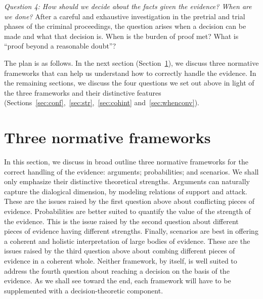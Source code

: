 \documentclass[10pt]{article}
\begin{document}

\textit{Question 4:	How should we decide about the facts given the evidence? When are we done?}
After a careful and exhaustive investigation in the pretrial and trial phases of the criminal proceedings, the question arises when a decision can be made and what that decision is. When is the burden of proof met? 
What is ``proof beyond a reasonable doubt''? %

\vspace{1em}
\noindent
The plan is as follows. In the next section (Section~\ref{sec:frameworks}), we discuss three normative frameworks 
that can help us understand how to correctly handle the evidence. %
In the remaining sections, we discuss the four questions we set out above in light of the three frameworks  and their 
distinctive features (Sections~\ref{sec:conf},~\ref{sec:str},~\ref{sec:cohint} and~\ref{sec:whenconv}). 




\section{Three normative frameworks}
\label{sec:frameworks}

In this section, we discuss in broad outline three normative frameworks for the correct handling of the evidence: 
arguments; probabilities; and scenarios. %
We shall only emphasize their distinctive theoretical strengths. Arguments can naturally 
capture the dialogical dimension, by modeling relations of support and attack. These are the issues raised by the first question above 
about conflicting pieces of evidence.  Probabilities are better suited to quantify the value of the strength of the evidence. 
This is the issue raised by the second question about different pieces of evidence having different strengths. 
Finally, scenarios are best in offering a coherent and holistic interpretation 
of large bodies of evidence. These are the issues raised by the third question 
above about combing different pieces of evidence in a coherent whole. 
Neither framework, by itself, is well suited to address the 
fourth question about reaching a decision on the basis of the evidence. 
As we shall see toward the end, each framework will have to be supplemented with a decision-theoretic component. 
\end{document}

